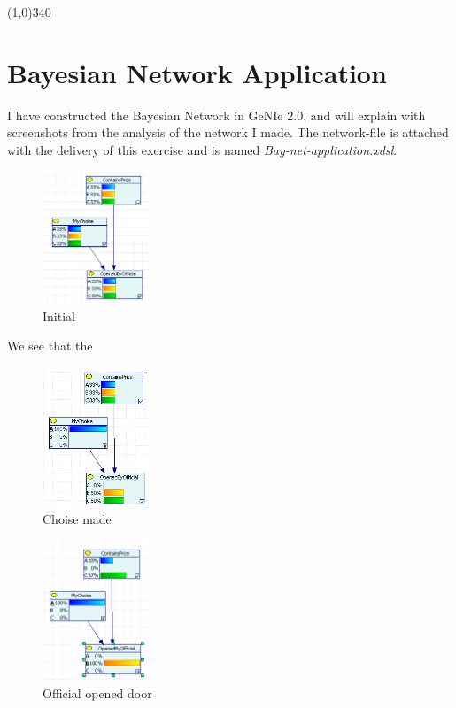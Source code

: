 \documentclass[english]{article}
\begin{document}
\line(1,0){340}
\section{Bayesian Network Application}
I have constructed the Bayesian Network in GeNIe 2.0, and will explain with
screenshots from the analysis of the network I made. The network-file is
attached with the delivery of this exercise and is named
\emph{Bay-net-application.xdsl}.

\begin{figure}
	\includegraphics[width=120px]{BNA-1.png}
	\caption{Initial}
\end{figure}

We see that the 

\begin{figure}
	\includegraphics[width=120px]{BNA-2.png}
	\caption{Choise made}
\end{figure}



\begin{figure}
	\includegraphics[width=120px]{BNA-3.png}
	\caption{Official opened door}
\end{figure}
\end{document}

